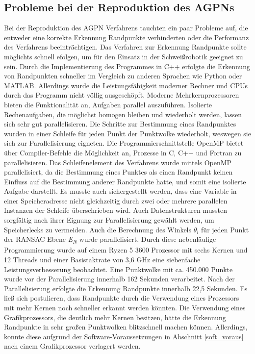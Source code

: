 \subsection{Probleme bei der Reproduktion des AGPNs}
Bei der Reproduktion des AGPN Verfahrens tauchten ein paar Probleme auf, die entweder eine korrekte Erkennung Randpunkte verhinderten oder die Performanz des Verfahrens beeinträchtigen. Das Verfahren zur Erkennung Randpunkte sollte möglichts schnell efolgen, um für den Einsatz in der Schweißrobotik geeignet zu sein. Durch die Implementierung des Programmes in C++ erfolgte die Erkennung von Randpunkten schneller im Vergleich zu anderen Sprachen wie Python oder MATLAB. Allerdings wurde die Leistungsfähigkeit moderner Rechner und CPUs durch das Programm nicht völlig ausgeschöpft. Moderne Mehrkernprozessoren bieten die Funktionalität an, Aufgaben parallel auszuführen. Isolierte Rechenaufgaben, die möglichst homogen bleiben und wiederholt werden, lassen sich sehr gut parallelisieren. Die Schritte zur Bestimmung eines Randpunktes wurden in einer Schleife für jeden Punkt der Punktwolke wiederholt, weswegen sie sich zur Parallelisierung eigneten. Die Programmierschnittstelle OpenMP bietet über Compiler-Befehle die Möglichkeit an, Prozesse in C, C++ und Fortran zu parallelisieren. Das Schleifenelement des Verfahrens wurde mittels OpenMP parallelisiert, da die Bestimmung eines Punktes als einen Randpunkt keinen Einfluss auf die Bestimmung anderer Randpunkte hatte, und somit eine isolierte Aufgabe darstellt. Es musste auch sichergestellt werden, dass eine Variable in einer Speicheradresse nicht gleichzeitig durch zwei oder mehrere parallelen Instanzen der Schleife überschrieben wird. Auch Datenstrukturen mussten sorgfältig nach ihrer Eignung zur Parallelisierung gewählt werden, um Speicherlecks zu vermeiden. Auch die Berechnung des Winkels $\theta_i$ für jeden Punkt der RANSAC-Ebene \textit{E\textsubscript{N}} wurde parallelisiert. Durch diese nebenläufige Programmierung wurde auf einem Ryzen 5 3600 Prozessor \autocite{noauthor_amd_2022} mit sechs Kernen und 12 Threads und einer Basistaktrate von 3,6 GHz eine siebenfache Leistungsverbesserung beobachtet. Eine Punktwolke mit ca. 450.000 Punkte wurde vor der Parallelisierung innerhalb 162 Sekunden verarbeitet. Nach der Parallelisierung erfolgte die Erkennung Randpunkte innerhalb 22,5 Sekunden. Es ließ sich postulieren, dass Randpunkte durch die Verwendung eines Prozessors mit mehr Kernen noch schneller erkannt werden könnten. Die Verwendung eines Grafikprozessors, die deutlich mehr Kernen besitzen, hätte die Erkennung Randpunkte in sehr großen Punktwolken blitzschnell machen können. Allerdings, konnte diese aufgrund der Software-Voraussetzungen in Abschnitt \ref{soft_voraus} nach einem Grafikprozessor verlagert werden.

